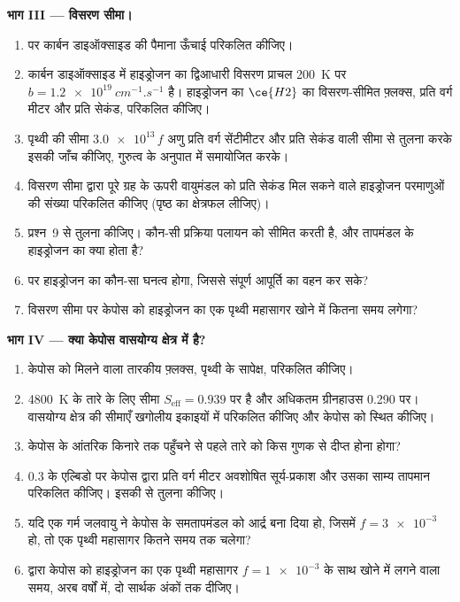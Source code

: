 \begin{problem}[{सप्ताहांत समस्या --- एक काल्पनिक
महासागर ग्रह का पलायन और ग्रहीय वासयोग्यता}]
\medskip\noindent\textbf{भाग III --- विसरण सीमा।}
\begin{enumerate}[resume]
\item {} पर कार्बन डाइऑक्साइड की पैमाना ऊँचाई परिकलित कीजिए।
\item कार्बन डाइऑक्साइड में हाइड्रोजन का द्विआधारी विसरण प्राचल
  \qty{200}{K} पर $b = \qty{1.2e19}{cm^{-1}.s^{-1}}$ है। हाइड्रोजन का
  $\ce{H2}$ का विसरण-सीमित फ़्लक्स, प्रति वर्ग मीटर और प्रति सेकंड, परिकलित कीजिए।
\item पृथ्वी की सीमा $\num{3.0e13}\,f$ अणु प्रति
  वर्ग सेंटीमीटर और प्रति सेकंड वाली सीमा से तुलना करके इसकी जाँच कीजिए, गुरुत्व के अनुपात में समायोजित करके।
\item विसरण सीमा द्वारा पूरे ग्रह के ऊपरी वायुमंडल को प्रति सेकंड मिल सकने वाले हाइड्रोजन परमाणुओं की
  संख्या परिकलित कीजिए (पृष्ठ का क्षेत्रफल
  लीजिए)।
\item प्रश्न~9 से तुलना कीजिए। कौन-सी प्रक्रिया पलायन को सीमित करती है, और
  तापमंडल के हाइड्रोजन का क्या होता है?
\item {} पर हाइड्रोजन का कौन-सा घनत्व होगा, जिससे 
  संपूर्ण आपूर्ति का वहन कर सके?
\item विसरण सीमा पर केपोस को हाइड्रोजन का एक पृथ्वी महासागर
  खोने में कितना समय लगेगा?
\end{enumerate}

\medskip\noindent\textbf{भाग IV --- क्या केपोस वासयोग्य क्षेत्र में है?}
\begin{enumerate}[resume]
\item केपोस को मिलने वाला तारकीय फ़्लक्स, पृथ्वी के सापेक्ष, परिकलित कीजिए।
\item \qty{4800}{K} के तारे के लिए  सीमा
  $S_\mathrm{eff} = 0.939$ पर है और अधिकतम ग्रीनहाउस 0.290 पर। वासयोग्य क्षेत्र की
  सीमाएँ खगोलीय इकाइयों में परिकलित कीजिए और केपोस को स्थित कीजिए।
\item केपोस के आंतरिक किनारे तक पहुँचने से पहले तारे को किस गुणक से
  दीप्त होना होगा?
\item 0.3 के एल्बिडो पर केपोस द्वारा प्रति वर्ग
  मीटर अवशोषित सूर्य-प्रकाश और उसका साम्य तापमान परिकलित कीजिए। इसकी
   से तुलना कीजिए।
\item यदि एक गर्म जलवायु ने केपोस के समतापमंडल को आर्द्र बना दिया हो,
  जिसमें $f = \num{3e-3}$ हो, तो एक पृथ्वी महासागर कितने समय तक चलेगा?
\item {} द्वारा केपोस को हाइड्रोजन का एक पृथ्वी महासागर
  $f = \num{1e-3}$ के साथ खोने में लगने वाला समय, अरब वर्षों में, दो
  सार्थक अंकों तक दीजिए।
\end{enumerate}
\end{problem}
